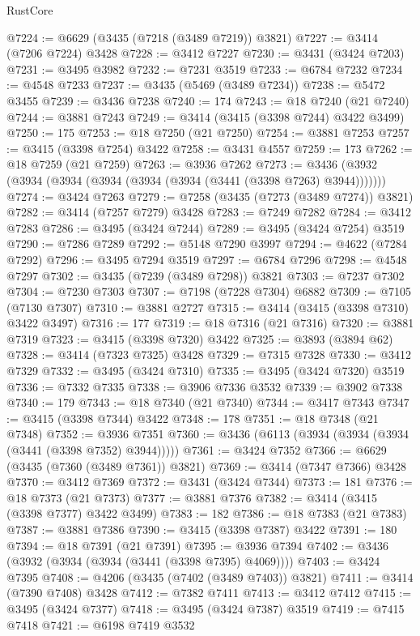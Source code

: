 \begin{lexlean}{RustCore}
\begin{coremodule}
@7224 := @6629 (@3435 (@7218 (@3489 @7219)) @3821)
@7227 := @3414 (@7206 @7224) @3428
@7228 := @3412 @7227
@7230 := @3431 (@3424 @7203)
@7231 := @3495 @3982
@7232 := @7231 @3519
@7233 := @6784 @7232
@7234 := @4548 @7233
@7237 := @3435 (@5469 (@3489 @7234))
@7238 := @5472 @3455
@7239 := @3436 @7238
@7240 := 174
@7243 := @18 @7240 (@21 @7240)
@7244 := @3881 @7243
@7249 := @3414 (@3415 (@3398 @7244) @3422 @3499)
@7250 := 175
@7253 := @18 @7250 (@21 @7250)
@7254 := @3881 @7253
@7257 := @3415 (@3398 @7254) @3422
@7258 := @3431 @4557
@7259 := 173
@7262 := @18 @7259 (@21 @7259)
@7263 := @3936 @7262
@7273 := @3436 (@3932 (@3934 (@3934 (@3934 (@3934 (@3934 (@3441 (@3398 @7263) @3944)))))))
@7274 := @3424 @7263
@7279 := @7258 (@3435 (@7273 (@3489 @7274)) @3821)
@7282 := @3414 (@7257 @7279) @3428
@7283 := @7249 @7282
@7284 := @3412 @7283
@7286 := @3495 (@3424 @7244)
@7289 := @3495 (@3424 @7254) @3519
@7290 := @7286 @7289
@7292 := @5148 @7290 @3997
@7294 := @4622 (@7284 @7292)
@7296 := @3495 @7294 @3519
@7297 := @6784 @7296
@7298 := @4548 @7297
@7302 := @3435 (@7239 (@3489 @7298)) @3821
@7303 := @7237 @7302
@7304 := @7230 @7303
@7307 := @7198 (@7228 @7304) @6882
@7309 := @7105 (@7130 @7307)
@7310 := @3881 @2727
@7315 := @3414 (@3415 (@3398 @7310) @3422 @3497)
@7316 := 177
@7319 := @18 @7316 (@21 @7316)
@7320 := @3881 @7319
@7323 := @3415 (@3398 @7320) @3422
@7325 := @3893 (@3894 @62)
@7328 := @3414 (@7323 @7325) @3428
@7329 := @7315 @7328
@7330 := @3412 @7329
@7332 := @3495 (@3424 @7310)
@7335 := @3495 (@3424 @7320) @3519
@7336 := @7332 @7335
@7338 := @3906 @7336 @3532
@7339 := @3902 @7338
@7340 := 179
@7343 := @18 @7340 (@21 @7340)
@7344 := @3417 @7343
@7347 := @3415 (@3398 @7344) @3422
@7348 := 178
@7351 := @18 @7348 (@21 @7348)
@7352 := @3936 @7351
@7360 := @3436 (@6113 (@3934 (@3934 (@3934 (@3441 (@3398 @7352) @3944)))))
@7361 := @3424 @7352
@7366 := @6629 (@3435 (@7360 (@3489 @7361)) @3821)
@7369 := @3414 (@7347 @7366) @3428
@7370 := @3412 @7369
@7372 := @3431 (@3424 @7344)
@7373 := 181
@7376 := @18 @7373 (@21 @7373)
@7377 := @3881 @7376
@7382 := @3414 (@3415 (@3398 @7377) @3422 @3499)
@7383 := 182
@7386 := @18 @7383 (@21 @7383)
@7387 := @3881 @7386
@7390 := @3415 (@3398 @7387) @3422
@7391 := 180
@7394 := @18 @7391 (@21 @7391)
@7395 := @3936 @7394
@7402 := @3436 (@3932 (@3934 (@3934 (@3441 (@3398 @7395) @4069))))
@7403 := @3424 @7395
@7408 := @4206 (@3435 (@7402 (@3489 @7403)) @3821)
@7411 := @3414 (@7390 @7408) @3428
@7412 := @7382 @7411
@7413 := @3412 @7412
@7415 := @3495 (@3424 @7377)
@7418 := @3495 (@3424 @7387) @3519
@7419 := @7415 @7418
@7421 := @6198 @7419 @3532

\end{coremodule}
\end{lexlean}
